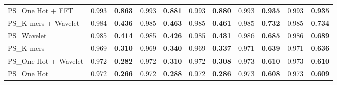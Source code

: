 \begin{table*}[htbp]
\begin{tabular}{lcccccccccc}
PS\_One Hot + FFT & 0.993 & \textbf{0.863} & 0.993 & \textbf{0.881} & 0.993 & \textbf{0.880} & 0.993 & \textbf{0.935} & 0.993 & \textbf{0.935} \\
PS\_K-mers + Wavelet & 0.984 & \textbf{0.436} & 0.985 & \textbf{0.463} & 0.985 & \textbf{0.461} & 0.985 & \textbf{0.732} & 0.985 & \textbf{0.734} \\
PS\_Wavelet & 0.985 & \textbf{0.414} & 0.985 & \textbf{0.426} & 0.985 & \textbf{0.431} & 0.986 & \textbf{0.685} & 0.986 & \textbf{0.689} \\
PS\_K-mers & 0.969 & \textbf{0.310} & 0.969 & \textbf{0.340} & 0.969 & \textbf{0.337} & 0.971 & \textbf{0.639} & 0.971 & \textbf{0.636} \\
PS\_One Hot + Wavelet & 0.972 & \textbf{0.282} & 0.972 & \textbf{0.310} & 0.972 & \textbf{0.308} & 0.973 & \textbf{0.610} & 0.973 & \textbf{0.610} \\
PS\_One Hot & 0.972 & \textbf{0.266} & 0.972 & \textbf{0.288} & 0.972 & \textbf{0.286} & 0.973 & \textbf{0.608} & 0.973 & \textbf{0.609} \\
\bottomrule
\end{tabular}
\end{table*}
